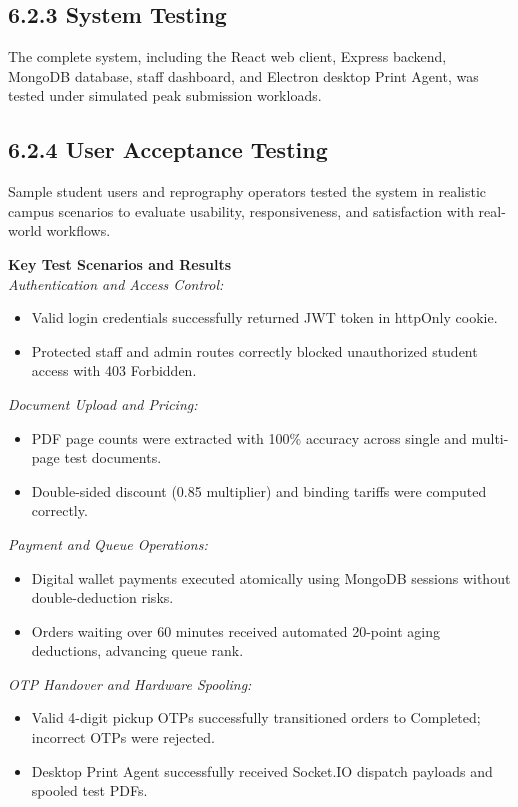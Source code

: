 \documentclass[12pt,a4paper]{report}
\begin{document}
\subsection{6.2.3 System Testing}
The complete system, including the React web client, Express backend, MongoDB database, staff dashboard, and Electron desktop Print Agent, was tested under simulated peak submission workloads.

\subsection{6.2.4 User Acceptance Testing}
Sample student users and reprography operators tested the system in realistic campus scenarios to evaluate usability, responsiveness, and satisfaction with real-world workflows.

\noindent\textbf{Key Test Scenarios and Results} \\
\noindent\textit{Authentication and Access Control:}
\begin{itemize}[leftmargin=0.35in, itemsep=1pt]
  \item Valid login credentials successfully returned JWT token in httpOnly cookie.
  \item Protected staff and admin routes correctly blocked unauthorized student access with 403 Forbidden.
\end{itemize}

\noindent\textit{Document Upload and Pricing:}
\begin{itemize}[leftmargin=0.35in, itemsep=1pt]
  \item PDF page counts were extracted with 100\% accuracy across single and multi-page test documents.
  \item Double-sided discount (0.85 multiplier) and binding tariffs were computed correctly.
\end{itemize}

\noindent\textit{Payment and Queue Operations:}
\begin{itemize}[leftmargin=0.35in, itemsep=1pt]
  \item Digital wallet payments executed atomically using MongoDB sessions without double-deduction risks.
  \item Orders waiting over 60 minutes received automated 20-point aging deductions, advancing queue rank.
\end{itemize}

\noindent\textit{OTP Handover and Hardware Spooling:}
\begin{itemize}[leftmargin=0.35in, itemsep=1pt]
  \item Valid 4-digit pickup OTPs successfully transitioned orders to Completed; incorrect OTPs were rejected.
  \item Desktop Print Agent successfully received Socket.IO dispatch payloads and spooled test PDFs.
\end{itemize}
\end{document}
